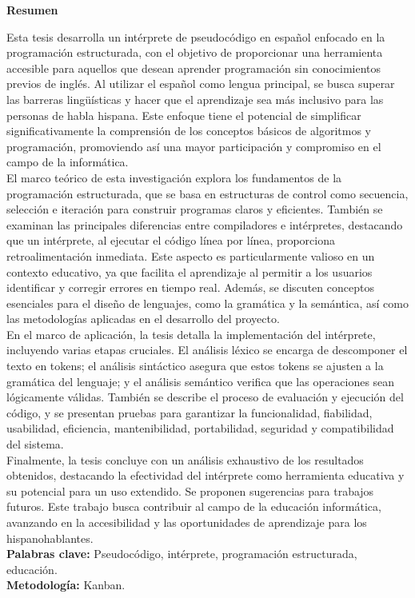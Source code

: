 \begin{spacing}{1.3}
  \begin{center}
    \Large \textbf{Resumen}
  \end{center}
  Esta tesis desarrolla un intérprete de pseudocódigo en español enfocado en la programación estructurada, con el objetivo de proporcionar una herramienta accesible para aquellos que desean aprender programación sin conocimientos previos de inglés. Al utilizar el español como lengua principal, se busca superar las barreras lingüísticas y hacer que el aprendizaje sea más inclusivo para las personas de habla hispana. Este enfoque tiene el potencial de simplificar significativamente la comprensión de los conceptos básicos de algoritmos y programación, promoviendo así una mayor participación y compromiso en el campo de la informática. \\
  El marco teórico de esta investigación explora los fundamentos de la programación estructurada, que se basa en estructuras de control como secuencia, selección e iteración para construir programas claros y eficientes. También se examinan las principales diferencias entre compiladores e intérpretes, destacando que un intérprete, al ejecutar el código línea por línea, proporciona retroalimentación inmediata. Este aspecto es particularmente valioso en un contexto educativo, ya que facilita el aprendizaje al permitir a los usuarios identificar y corregir errores en tiempo real. Además, se discuten conceptos esenciales para el diseño de lenguajes, como la gramática y la semántica, así como las metodologías aplicadas en el desarrollo del proyecto. \\  
  En el marco de aplicación, la tesis detalla la implementación del intérprete, incluyendo varias etapas cruciales. El análisis léxico se encarga de descomponer el texto en tokens; el análisis sintáctico asegura que estos tokens se ajusten a la gramática del lenguaje; y el análisis semántico verifica que las operaciones sean lógicamente válidas. También se describe el proceso de evaluación y ejecución del código, y se presentan pruebas para garantizar la funcionalidad, fiabilidad, usabilidad, eficiencia, mantenibilidad, portabilidad, seguridad y compatibilidad del sistema. \\  
  Finalmente, la tesis concluye con un análisis exhaustivo de los resultados obtenidos, destacando la efectividad del intérprete como herramienta educativa y su potencial para un uso extendido. Se proponen sugerencias para trabajos futuros. Este trabajo busca contribuir al campo de la educación informática, avanzando en la accesibilidad y las oportunidades de aprendizaje para los hispanohablantes. \\
  \textbf{Palabras clave:} Pseudocódigo, intérprete, programación estructurada, educación. \\
  \textbf{Metodología:} Kanban.
\end{spacing}
